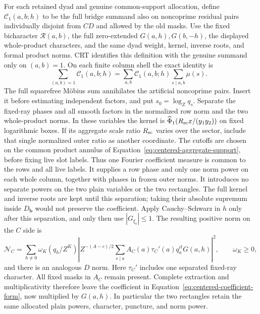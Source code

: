 \documentclass[12pt]{article}
\begin{document}
For each retained dyad and genuine common-support allocation, define
\(\mathcal C_1(a,b;h)\) to be the full bridge summand also on noncoprime
residual pairs individually disjoint from \(CD\) and allowed by the old
masks.  Use the fixed bicharacter \(\mathcal R(a,b)\), the full
zero-extended \(G(a,h),G(b,-h)\), the displayed whole-product characters,
and the same dyad weight, kernel, inverse roots, and formal product norms.
CRT identifies this definition with the genuine summand only on
\((a,b)=1\).  On each finite column shell the exact identity is
\[
 \sum_{(a,b)=1}\mathcal C_1(a,b;h)
 =\sum_{a,b}\mathcal C_1(a,b;h)\sum_{s\mid a,b}\mu(s).
\]
The full squarefree M\"obius sum annihilates the artificial noncoprime
pairs.  Insert it before estimating independent factors, and put
\(s_0=\log_Zq_s\).
Separate the fixed-ray phases and all smooth factors in the normalized
row norm and the two whole-product norms.  In these variables the
kernel is \(\widehat\Phi_1(R_{\rm sc}x/(y_1y_2))\) on fixed logarithmic
boxes.  If its aggregate scale ratio \(R_{\rm sc}\) varies over the sector,
include that single normalized outer ratio as another coordinate.
The cutoffs are chosen on the common product annulus of
Equation~\eqref{eq:centered-aggregate-support}, before fixing live slot
labels.  Thus one Fourier coefficient measure is common to the rows and
all live labels.  It supplies a row phase and only one norm power on each
whole column, together with phases in frozen outer norms.  It introduces
no separate powers on the two plain variables or the two rectangles.
The full kernel and inverse roots are kept until this separation;
taking their absolute supremum inside \(D_{\mathbf b}\) would not
preserve the coefficient.  Apply Cauchy--Schwarz in \(h\) only after this separation,
and only then use \(|G_{\xi_{\mathfrak r}}|\le1\).  The resulting positive norm
on the \(C\) side is
\[
 \mathcal N_C=
 \sum_{h\ne0}\omega_K(q_h/Z^K)
 \left|Z^{-(A-c)/2}
   \sum_{s\mid a}A_C(a)\tau_C'(a)q_a^{it}G(a,h)\right|^2,
 \qquad \omega_K\ge0,
\]
and there is an analogous \(D\) norm.  Here \(\tau_C'\) includes
one separated fixed-ray character.  All fixed masks in \(A_C\)
remain present.  Complete extraction and multiplicativity therefore leave
the coefficient in Equation~\eqref{eq:centered-coefficient-form}, now
multiplied by \(G(a,h)\).  In particular the two rectangles retain the
same allocated plain powers, character, puncture, and norm power.
\end{document}
